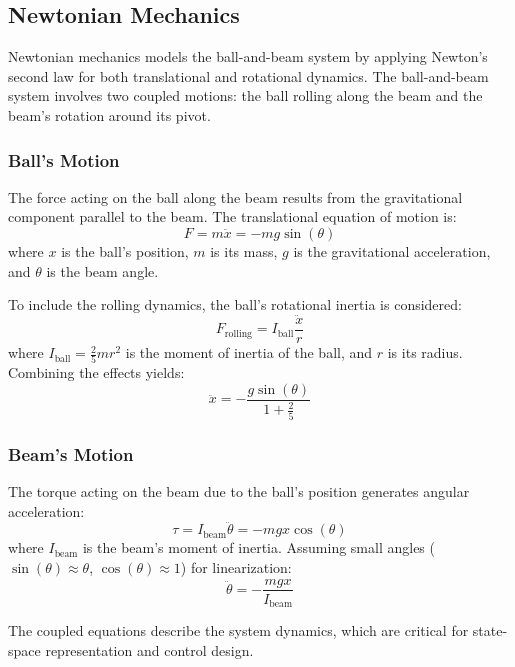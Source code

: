 \documentclass[conference]{IEEEtran}
\begin{document}
\subsection{Newtonian Mechanics}
Newtonian mechanics models the ball-and-beam system by applying Newton's second law for both translational and rotational dynamics. The ball-and-beam system involves two coupled motions: the ball rolling along the beam and the beam's rotation around its pivot.

\subsubsection{Ball's Motion}
The force acting on the ball along the beam results from the gravitational component parallel to the beam. The translational equation of motion is:
\begin{equation}
F = m \ddot{x} = -m g \sin(\theta)
\end{equation}
where \(x\) is the ball's position, \(m\) is its mass, \(g\) is the gravitational acceleration, and \(\theta\) is the beam angle.

To include the rolling dynamics, the ball's rotational inertia is considered:
\begin{equation}
F_{\text{rolling}} = I_{\text{ball}} \frac{\ddot{x}}{r}
\end{equation}
where \(I_{\text{ball}} = \frac{2}{5}mr^2\) is the moment of inertia of the ball, and \(r\) is its radius. Combining the effects yields:
\begin{equation}
\ddot{x} = -\frac{g \sin(\theta)}{1 + \frac{2}{5}}
\end{equation}

\subsubsection{Beam's Motion}
The torque acting on the beam due to the ball's position generates angular acceleration:
\begin{equation}
\tau = I_{\text{beam}} \ddot{\theta} = -m g x \cos(\theta)
\end{equation}
where \(I_{\text{beam}}\) is the beam's moment of inertia. Assuming small angles (\(\sin(\theta) \approx \theta\), \(\cos(\theta) \approx 1\)) for linearization:
\begin{equation}
\ddot{\theta} = -\frac{m g x}{I_{\text{beam}}}
\end{equation}

The coupled equations describe the system dynamics, which are critical for state-space representation and control design.
\end{document}
